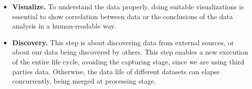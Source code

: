\begin{itemize}
    \item \textbf{Visualize.} To understand the data properly, doing suitable visualizations is essential to show correlation between data or the conclusions of the data analysis in a human-readable way.
    \item \textbf{Discovery.} This step is about discovering data from external sources, or about our data being discovered by others. This step enables a new execution of the entire life cycle, avoiding the capturing stage, since we are using third parties data. Otherwise, the data life of different datasets can elapse concurrently, being merged at processing stage.
\end{itemize}

